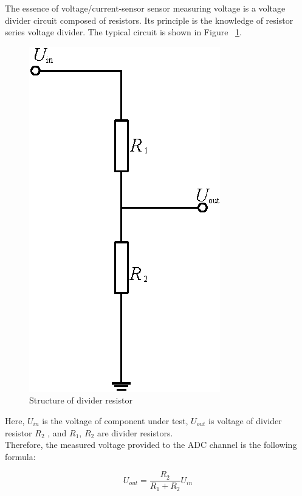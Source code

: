 The essence of voltage/current-sensor sensor measuring voltage is a voltage divider circuit composed of resistors. Its principle is the knowledge of resistor series voltage divider. The typical circuit is shown in Figure ~\ref{fig:2.1}. 
\begin{figure}[h]
	\centering
	\includegraphics{grafiken/2.1.eps}
	\caption{Structure of divider resistor} 
	\label{fig:2.1}
\end{figure}
Here, $U_{in}$ is the voltage of component under test, $U_{out}$ is voltage of divider resistor $R_{2}$ , and $R_{1}$, $R_{2}$ are divider resistors.
\\
Therefore, the measured voltage provided to the ADC channel is the following formula:
\\
\begin{center} 
\begin{equation}
 U_{out} = \frac{R_{2}}{R_{1}+R_{2}} U_{in}  
\end{equation}
\end{center}

